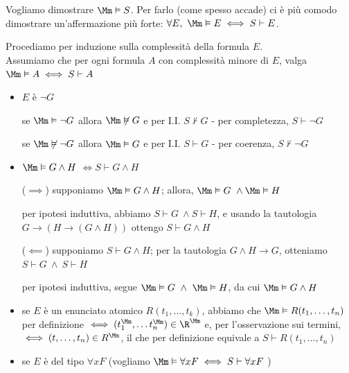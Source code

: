 \documentclass[a4paper,11pt]{report}
\begin{document}
Vogliamo dimostrare \( \Mm \vDash S \). Per farlo (come spesso accade) ci è più comodo dimostrare un'affermazione più forte: \( \forall E, \ \Mm \vDash E \iff S \vdash E \).

\begin{proofframe}{}
    Procediamo per induzione sulla complessità della formula \( E \).\\
    Assumiamo che per ogni formula \( A \) con complessità minore di \( E \), valga \( \Mm \vDash A \iff S \vdash A \)
    \begin{itemize}
        \item \( E \)  è \( \neg G \)

            \subitem se \(\Mm \vDash \neg G\) allora \( \Mm\not\vDash G \) e per I.I. \( S\not\vdash G \) - per completezza, \( S\vdash \neg G \)

            \subitem se \(\Mm \not\vDash \neg G\) allora \( \Mm\vDash G \) e per I.I. \( S\vdash G \) - per coerenza, \( S\not\vdash \neg G \)

        \item \( \Mm \vDash G \land H \) {\color{CadetBlue}\( \iff S\vdash G \land H \)}

            (\( \implies \)) {\color{CadetBlue}supponiamo \( \Mm \vDash G\land H \);}
            \subitem allora, \( \Mm \vDash G \ \land \Mm \vDash H\) 

            \subitem per ipotesi induttiva, abbiamo \( S \vdash G \ \land S \vdash H \), e usando la tautologia \( G\to (H \to (G \land H)) \) ottengo \( S\vdash G\land H \) 

            (\( \impliedby \)) {\color{CadetBlue}supponiamo \( S \vdash G \land H \);}
            \subitem per la tautologia \( G\land H \to G \), otteniamo \( S\vdash G \ \land \ S \vdash H \)

            \subitem per ipotesi induttiva, segue \( \Mm\vDash G \ \land \ \Mm \vDash H \), da cui \( \Mm\vDash G \land H \)
            
        \item se \(E\) è un enunciato atomico \( R(t_1, \dots, t_k) \), abbiamo che \( \Mm \vDash R(t_1, \dots, t_n) \) per definizione \(\iff (t^\Mm_1, \dots t^\Mm_n)\in \R^\Mm \) e, per l'osservazione sui termini, \( \iff (t, \dots, t_n)\in R^\Mm \), il che per definizione equivale a \( S\vdash R(t_1, \dots, t_n) \)

        \item se \( E \) è del tipo \( \forall x F \) {\color{gray}\small(vogliamo \( \Mm \vDash \forall x F \iff S \vdash \forall x F \) )}
            

\end{itemize}
\end{proofframe}
\end{document}
